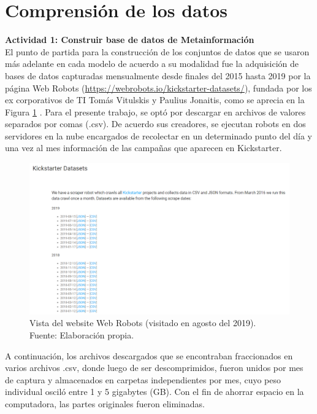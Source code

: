 \section{Comprensión de los datos}
\textbf{Actividad 1: Construir base de datos de Metainformación}
\\
El punto de partida para la construcción de los conjuntos de datos que se usaron más adelante en cada modelo de acuerdo a su modalidad fue la adquisición de bases de datos capturadas mensualmente desde finales del 2015 hasta 2019 por la página Web Robots (\url{https://webrobots.io/kickstarter-datasets/}), fundada por los ex corporativos de TI Tomás Vitulskis y Paulius Jonaitis, como se aprecia en la Figura \ref{4:fig1} \cite{ot_webrobots2019kickstarter}. Para el presente trabajo, se optó por descargar en archivos de valores separados por comas (.csv). De acuerdo sus creadores, se ejecutan robots en dos servidores en la nube encargados de recolectar en un determinado punto del día y una vez al mes información de las campañas que aparecen en Kickstarter.

\begin{figure}[!ht]
	\begin{center}
		\includegraphics[width=1\textwidth]{4/figures/web_robots_2019.png}
		\caption[Vista del website Web Robots (visitado en agosto del 2019)]{Vista del website Web Robots (visitado en agosto del 2019).\\
		Fuente: Elaboración propia.}
		\label{4:fig1}
	\end{center}
\end{figure}

A continuación, los archivos descargados que se encontraban fraccionados en varios archivos .csv, donde luego de ser descomprimidos, fueron unidos por mes de captura y almacenados en carpetas independientes por mes, cuyo peso individual osciló entre 1 y 5 gigabytes (GB). Con el fin de ahorrar espacio en la computadora, las partes originales fueron eliminadas.

